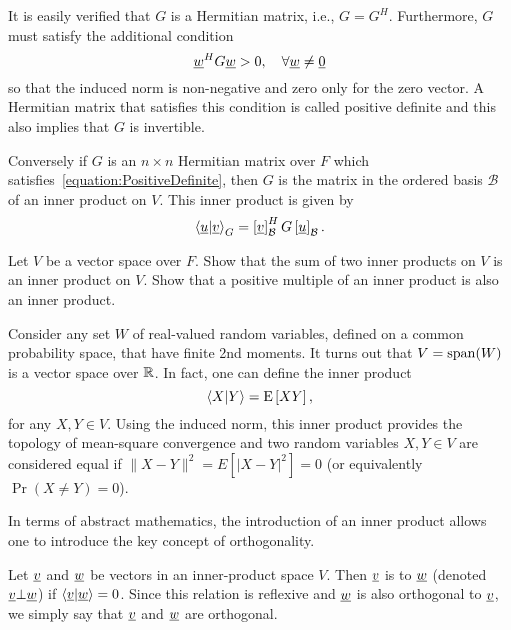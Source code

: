 It is easily verified that $G$ is a Hermitian matrix, i.e., $G = G^H$.
Furthermore, $G$ must satisfy the additional condition
\begin{equation} \label{equation:PositiveDefinite}
\underline{w}^H G \underline{w} > 0, \quad \forall \underline{w} \neq \underline{0}
\end{equation}
so that the induced norm is non-negative and zero only for the zero vector.
A Hermitian matrix that satisfies this condition is called positive definite and this also implies that $G$ is invertible.

Conversely if $G$ is an $n \times n$ Hermitian matrix over $F$ which satisfies~\eqref{equation:PositiveDefinite}, then $G$ is the matrix in the ordered basis $\mathcal{B}$ of an inner product on $V$.
This inner product is given by
\begin{equation*}
\left\langle \underline{u} | \underline{v} \right\rangle_G
= \left[ \underline{v} \right]_{\mathcal{B}}^H G \left[ \underline{u} \right]_{\mathcal{B}}.
\end{equation*}

\begin{problem}
Let $V$ be a vector space over $F$.
Show that the sum of two inner products on $V$ is an inner product on $V$.
Show that a positive multiple of an inner product is also an inner product.
\end{problem}

\begin{example}
Consider any set $W$ of real-valued random variables, defined on a common probability space, that have finite 2nd moments.
It turns out that $V = \mathrm{span} (W)$ is a vector space over $\mathbb{R}$.
In fact, one can define the inner product
\begin{equation*}
\left\langle X | Y \right\rangle = \mathrm{E} \left[ XY \right] ,
\end{equation*}
for any $X,Y \in V$.
Using the induced norm, this inner product provides the topology of mean-square convergence and two random variables $X,Y\in V$ are considered equal if $\| X-Y \|^2 = E \left[ |X-Y|^2 \right] = 0$ (or equivalently $\Pr (X \neq Y ) = 0$).
\end{example}

In terms of abstract mathematics, the introduction of an inner product allows one to introduce the key concept of orthogonality.

\begin{definition}
Let $\underline{v}$ and $\underline{w}$ be vectors in an inner-product space $V$.
Then $\underline{v}$ is  to $\underline{w}$ (denoted $\underline{v} \bot \underline{w}$) if $\left\langle \underline{v} | \underline{w} \right\rangle = 0$.
Since this relation is reflexive and $\underline{w}$ is also orthogonal to $\underline{v}$, we simply say that $\underline{v}$ and $\underline{w}$ are orthogonal.
\end{definition}


